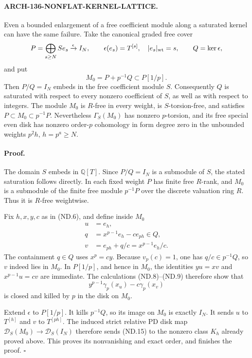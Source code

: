 \paragraph{ARCH-136-NONFLAT-KERNEL-LATTICE.}
Even a bounded enlargement of a free coefficient module along a
saturated kernel can have the same failure. Take the canonical
graded free cover
\[
 P=\bigoplus_{s\geq N}S e_s\xrightarrow{\epsilon}I_N,
 \qquad \epsilon(e_s)=T^{[s]},\quad |e_s|_{\rm wt}=s,
 \qquad Q=\ker\epsilon,
\]
and put
\[
             M_0=P+p^{-1}Q\subset P[1/p].                 \tag{ND.13}
\]
Then \(P/Q=I_N\) embeds in the free coefficient module \(S\).
Consequently \(Q\) is saturated with respect to every nonzero
coefficient of \(S\), as well as with respect to integers.
The module \(M_0\) is \(R\)-free in every weight, is
\(S\)-torsion-free, and satisfies
\(P\subset M_0\subset p^{-1}P\).
Nevertheless \(\Gamma_S(M_0)\) has nonzero \(p\)-torsion,
and its free special even disk has nonzero order-\(p\)
cohomology in form degree zero in the unbounded weights \(p^2h\),
\(h=p^a\geq N\).

\paragraph{Proof.}
The domain \(S\) embeds in \(\mathbb Q[T]\).
Since \(P/Q=I_N\) is a submodule of \(S\), the stated
saturation follows directly. In each fixed weight \(P\) has
finite free \(R\)-rank, and \(M_0\) is a submodule of the
finite free module \(p^{-1}P\) over the discrete valuation ring
\(R\). Thus it is \(R\)-free weightwise.

Fix \(h,x,y,c\) as in (ND.6), and define inside \(M_0\)
\[
 \begin{split}
  u&=e_h,\\
  q&=x^{p-1}e_h-c e_{ph}\in Q,\\
  v&=e_{ph}+q/c=x^{p-1}e_h/c.
 \end{split}                                               \tag{ND.14}
\]
The containment \(q\in Q\) uses \(x^p=cy\).
Because \(v_p(c)=1\), one has \(q/c\in p^{-1}Q\), so
\(v\) indeed lies in \(M_0\). In \(P[1/p]\), and hence in
\(M_0\), the identities
\(yu=xv\) and \(x^{p-1}u=cv\) are immediate.
The calculations (ND.8)--(ND.9) therefore show that
\[
                 y^{p-1}\gamma_p(x_u)-c\gamma_p(x_v)
                                                               \tag{ND.15}
\]
is closed and killed by \(p\) in the disk on \(M_0\).

Extend \(\epsilon\) to \(P[1/p]\).
It kills \(p^{-1}Q\), so its image on \(M_0\) is exactly
\(I_N\). It sends \(u\) to \(T^{[h]}\) and \(v\) to
\(T^{[ph]}\). The induced strict relative PD disk map
\(\mathscr D_S(M_0)\to\mathscr D_S(I_N)\) therefore sends
(ND.15) to the nonzero class \(K_h\) already proved above.
This proves its nonvanishing and exact order, and finishes the
proof. \(\square\)


